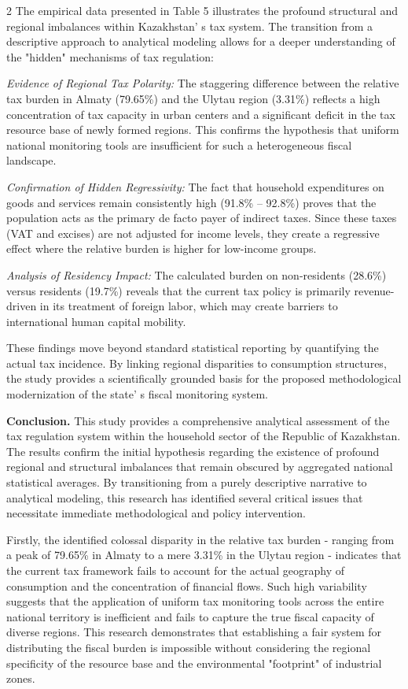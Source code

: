 \begin{multicols}{2}
The empirical data presented in Table 5 illustrates the profound
structural and regional imbalances within Kazakhstan' s
tax system. The transition from a descriptive approach to analytical
modeling allows for a deeper understanding of the "hidden" mechanisms of
tax regulation:

\emph{Evidence of Regional Tax Polarity:} The staggering difference
between the relative tax burden in Almaty (79.65\%) and the Ulytau
region (3.31\%) reflects a high concentration of tax capacity in urban
centers and a significant deficit in the tax resource base of newly
formed regions. This confirms the hypothesis that uniform national
monitoring tools are insufficient for such a heterogeneous fiscal
landscape.

\emph{Confirmation of Hidden Regressivity:} The fact that household
expenditures on goods and services remain consistently high (91.8\% --
92.8\%) proves that the population acts as the primary de facto payer of
indirect taxes. Since these taxes (VAT and excises) are not adjusted for
income levels, they create a regressive effect where the relative burden
is higher for low-income groups.

\emph{Analysis of Residency Impact:} The calculated burden on
non-residents (28.6\%) versus residents (19.7\%) reveals that the
current tax policy is primarily revenue-driven in its treatment of
foreign labor, which may create barriers to international human capital
mobility.

These findings move beyond standard statistical reporting by quantifying
the actual tax incidence. By linking regional disparities to consumption
structures, the study provides a scientifically grounded basis for the
proposed methodological modernization of the state' s
fiscal monitoring system.

{\bfseries Conclusion.} This study provides a comprehensive analytical
assessment of the tax regulation system within the household sector of
the Republic of Kazakhstan. The results confirm the initial hypothesis
regarding the existence of profound regional and structural imbalances
that remain obscured by aggregated national statistical averages. By
transitioning from a purely descriptive narrative to analytical
modeling, this research has identified several critical issues that
necessitate immediate methodological and policy intervention.

Firstly, the identified colossal disparity in the relative tax burden -
ranging from a peak of 79.65\% in Almaty to a mere 3.31\% in the Ulytau
region - indicates that the current tax framework fails to account for
the actual geography of consumption and the concentration of financial
flows. Such high variability suggests that the application of uniform
tax monitoring tools across the entire national territory is inefficient
and fails to capture the true fiscal capacity of diverse regions. This
research demonstrates that establishing a fair system for distributing
the fiscal burden is impossible without considering the regional
specificity of the resource base and the environmental "footprint" of
industrial zones.


\end{multicols}
